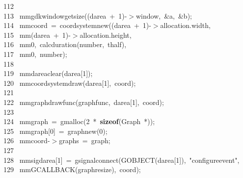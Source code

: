 \documentclass[10pt,a4paper]{article}
\newcommand{\hlstd}[1]{\textcolor[rgb]{0,0,0}{#1}}
\newcommand{\hlkey}[1]{\textcolor[rgb]{0,0,0}{\bf{#1}}}
\newcommand{\hlnum}[1]{\textcolor[rgb]{0.16,0.16,1}{#1}}
\newcommand{\hlstr}[1]{\textcolor[rgb]{1,0,0}{#1}}
\newcommand{\hlline}[1]{\textcolor[rgb]{0.33,0.33,0.33}{#1}}
\begin{document}
{}\hlline{\ 112\ }\hlstd{\mbox{}\\
}\hlline{\ 113\ }\hlstd{\hlstd{ mm}gdk\textunderscore window\textunderscore get\textunderscore size((darea\ +\ }\hlnum{1}\hlstd{)-$>$window,\ \&a,\ \&b);\mbox{}\\
}\hlline{\ 114\ }\hlstd{\hlstd{ mm}coord\ =\ coord\textunderscore system\textunderscore new((darea\ +\ }\hlnum{1}\hlstd{)-$>$allocation.width,\mbox{}\\
}\hlline{\ 115\ }\hlstd{\hlstd{ mm}(darea\ +\ }\hlnum{1}\hlstd{)-$>$allocation.height,\mbox{}\\
}\hlline{\ 116\ }\hlstd{\hlstd{ mm}}\hlnum{0}\hlstd{,\ calc\textunderscore duration(number,\ thalf),\mbox{}\\
}\hlline{\ 117\ }\hlstd{\hlstd{ mm}}\hlnum{0}\hlstd{,\ number);\mbox{}\\
}\hlline{\ 118\ }\hlstd{\mbox{}\\
}\hlline{\ 119\ }\hlstd{\hlstd{ mm}darea\textunderscore clear(darea[}\hlnum{1}\hlstd{]);\mbox{}\\
}\hlline{\ 120\ }\hlstd{\hlstd{ mm}coord\textunderscore system\textunderscore draw(darea[}\hlnum{1}\hlstd{],\ coord);\mbox{}\\
}\hlline{\ 121\ }\hlstd{\mbox{}\\
}\hlline{\ 122\ }\hlstd{\hlstd{ mm}graph\textunderscore draw\textunderscore func(graph\textunderscore func,\ darea[}\hlnum{1}\hlstd{],\ coord);\mbox{}\\
}\hlline{\ 123\ }\hlstd{\mbox{}\\
}\hlline{\ 124\ }\hlstd{\hlstd{ mm}graph\ =\ g\textunderscore malloc(}\hlnum{2\ }\hlstd{*\ }\hlkey{sizeof}\hlstd{(Graph\ *));\mbox{}\\
}\hlline{\ 125\ }\hlstd{\hlstd{ mm}graph[}\hlnum{0}\hlstd{]\ =\ graph\textunderscore new(}\hlnum{0}\hlstd{);\mbox{}\\
}\hlline{\ 126\ }\hlstd{\hlstd{ mm}coord-$>$graphs\ =\ graph;\mbox{}\\
}\hlline{\ 127\ }\hlstd{\mbox{}\\
}\hlline{\ 128\ }\hlstd{\hlstd{ mm}sig\textunderscore darea[}\hlnum{1}\hlstd{]\ =\ g\textunderscore signal\textunderscore connect(G\textunderscore OBJECT(darea[}\hlnum{1}\hlstd{]),\ }\hlstr{"configure\textunderscore event"}\hlstd{,\mbox{}\\
}\hlline{\ 129\ }\hlstd{\hlstd{ mm}G\textunderscore CALLBACK(graph\textunderscore resize),\ coord);\mbox{}\\
}
\end{document}
